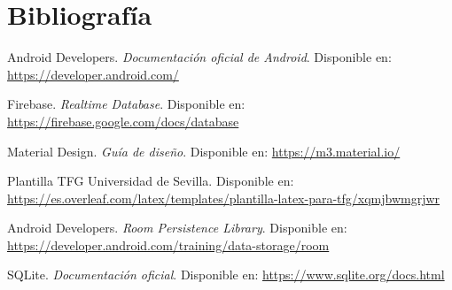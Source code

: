 \chapter{Bibliografía}

\begin{thebibliography}{9}

Android Developers. \emph{Documentación oficial de Android}. Disponible en: \url{https://developer.android.com/}

Firebase. \emph{Realtime Database}. Disponible en: \url{https://firebase.google.com/docs/database}

Material Design. \emph{Guía de diseño}. Disponible en: \url{https://m3.material.io/}

Plantilla TFG Universidad de Sevilla. Disponible en: \url{https://es.overleaf.com/latex/templates/plantilla-latex-para-tfg/xqmjbwmgrjwr}

Android Developers. \emph{Room Persistence Library}. Disponible en: \url{https://developer.android.com/training/data-storage/room}

SQLite. \emph{Documentación oficial}. Disponible en: \url{https://www.sqlite.org/docs.html}

\end{thebibliography} 